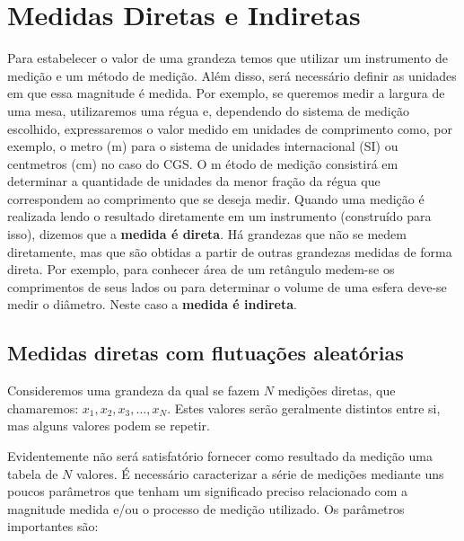 \chapter{Medidas Diretas e Indiretas}
\label{sec:medidasDir&Indir}
\vspace{-0.5cm}
Para estabelecer o valor de uma grandeza temos que utilizar um instrumento de medi\c c\~ao e um m\'etodo de medi\c c\~ao. Al\'em disso, ser\'a necess\'ario definir as unidades em que essa magnitude \'e medida. Por exemplo, se queremos medir a largura de uma mesa, utilizaremos uma r\'egua e, dependendo do sistema de medi\c c\~ao escolhido, expressaremos o valor medido em unidades de comprimento como, por exemplo, o metro (m) para o sistema de unidades internacional (SI) ou centmetros (cm) no caso do CGS. O m \'etodo de medi\c c\~ao consistir\'a em determinar a quantidade de unidades da menor fra\c c\~ao da r\'egua que correspondem ao comprimento que se deseja medir. Quando uma medi\c c\~ao  \'e realizada lendo o resultado diretamente em um instrumento (constru\'ido para isso), dizemos que a {\bf medida \'e direta}. H\'a grandezas que n\~ao se medem diretamente, mas que s\~ao obtidas a partir de outras grandezas medidas de forma direta.  Por exemplo, para conhecer \'area de um ret\^angulo medem-se os comprimentos de seus lados ou para determinar o volume de uma esfera deve-se medir o di\^ametro.  Neste caso a {\bf medida \'e indireta}. 
\section*{Medidas diretas com flutua\c c\~oes aleat\'orias}\label{stat}

Consideremos uma grandeza da qual se fazem $N$ medi\c c\~oes diretas, que chamaremos: $x_1, x_2, x_3, ... , x_N$. Estes valores ser\~ao geralmente distintos entre si, mas alguns valores podem se repetir. 

Evidentemente n\~ao ser\'a satisfat\'orio fornecer como resultado da medi\c c\~ao uma tabela de $N$ valores. \'E necess\'ario caracterizar a s\'erie de medi\c c\~oes mediante uns poucos par\^ametros que tenham um significado preciso relacionado com a magnitude medida e/ou o processo de medi\c c\~ao utilizado. Os par\^ametros importantes s\~ao:

